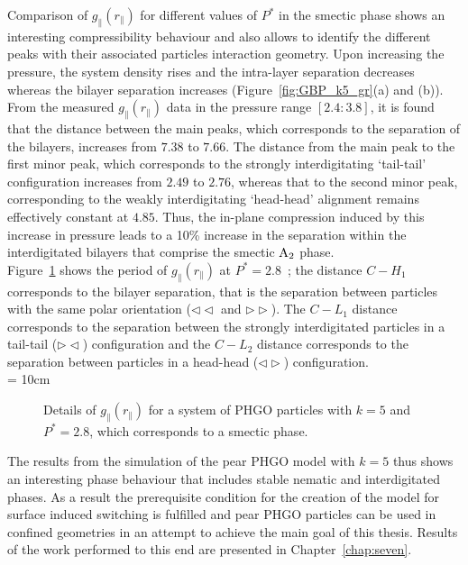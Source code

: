 Comparison of $g_\parallel(r_\parallel)$ for different values of $P^{*}$ in the smectic phase
shows an interesting compressibility behaviour and also allows to identify the different 
peaks with their associated particles interaction geometry. Upon increasing the pressure, 
the system density rises  and the intra-layer separation decreases whereas the bilayer 
separation increases  (Figure~\ref{fig:GBP_k5_gr}(a) and (b)). 
From the measured $g_\parallel(r_\parallel)$ data in the pressure range $[2.4:3.8]$,
it is found that the distance between the 
main peaks, which corresponds to the separation of the bilayers, increases from $7.38$ 
to $7.66$. The distance from the main peak to the first minor peak, which corresponds to 
the strongly interdigitating `tail-tail' configuration increases from $2.49$ to $2.76$, 
whereas that to the second minor peak, corresponding to the weakly interdigitating `head-head' 
alignment remains effectively constant at $4.85$. Thus, the in-plane compression induced by 
this increase in pressure leads to a 10\% increase in the separation within the interdigitated 
bilayers that comprise the smectic ${\rm A_2}$ phase.\\
Figure~\ref{fig:GBP_k5_grDetails} shows the period of $g_\parallel(r_\parallel)$ at
$P^{*}=2.8$~; the distance $C-H_1$ corresponds to the bilayer separation, that is the separation
between particles with the same polar orientation ($\lhd\lhd$ and $\rhd\rhd$). The $C-L_1$
distance corresponds to the separation between the strongly interdigitated particles in a 
tail-tail ($\rhd\lhd$) configuration and the $C-L_2$ distance corresponds to the separation
between particles in a head-head ($\lhd\rhd$) configuration.\\

\picW = 10cm
\begin{figure}
	\centering
	\caption{Details of $g_\parallel(r_\parallel)$ for a system of PHGO particles with $k=5$
	and $P^{*}=2.8$, which corresponds to a smectic phase.}
	\label{fig:GBP_k5_grDetails}
\end{figure}


The results from the simulation of the pear PHGO model with $k=5$ thus shows an interesting
phase behaviour that includes stable nematic and interdigitated \smA phases. As a result 
the prerequisite 
condition for the creation of the model for surface induced switching is fulfilled and pear 
PHGO particles can be used in confined geometries in an attempt to achieve the main goal of this
thesis. Results  of the work performed to this end are presented in Chapter~\ref{chap:seven}.




